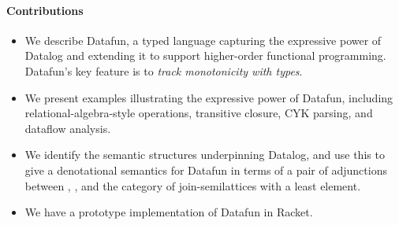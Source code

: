 \documentclass[preprint]{sigplanconf}
\begin{document}
\TODO

\paragraph{Contributions}
\begin{itemize}
\item We describe Datafun, a typed language capturing the expressive power of
  Datalog and extending it to support higher-order functional programming.
  Datafun's key feature is to \emph{track monotonicity with types}.

\item We present examples illustrating the expressive power of Datafun,
  including relational-algebra-style operations, transitive closure, CYK
  parsing, and dataflow analysis.

\item We identify the semantic structures underpinning Datalog, and use this to
  give a denotational semantics for Datafun in terms of a pair of adjunctions
  between , , and the category of join-semilattices with a
  least element.

\item We have a prototype implementation of Datafun in Racket. 
\end{itemize}




\end{document}
